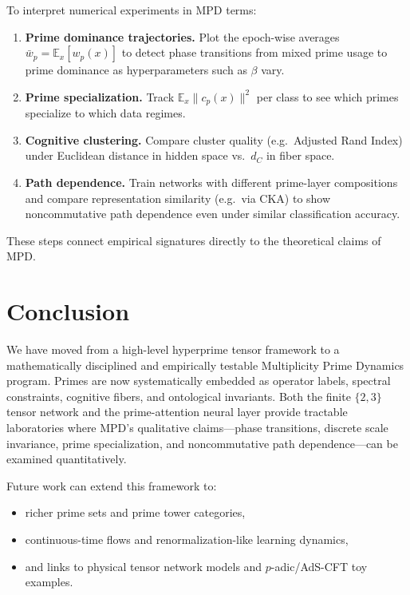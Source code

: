 \documentclass[11pt]{article}
\begin{document}
To interpret numerical experiments in MPD terms:

\begin{enumerate}[nosep]
  \item \textbf{Prime dominance trajectories.} Plot the epoch-wise averages $\bar{w}_p = \mathbb{E}_x[w_p(x)]$ to detect phase transitions from mixed prime usage to prime dominance as hyperparameters such as $\beta$ vary.
  \item \textbf{Prime specialization.} Track $\mathbb{E}_x\|c_p(x)\|^2$ per class to see which primes specialize to which data regimes.
  \item \textbf{Cognitive clustering.} Compare cluster quality (e.g.\ Adjusted Rand Index) under Euclidean distance in hidden space vs.\ $d_C$ in fiber space.
  \item \textbf{Path dependence.} Train networks with different prime-layer compositions and compare representation similarity (e.g.\ via CKA) to show noncommutative path dependence even under similar classification accuracy.
\end{enumerate}

These steps connect empirical signatures directly to the theoretical claims of MPD.

\section{Conclusion}

We have moved from a high-level hyperprime tensor framework to a mathematically disciplined and empirically testable Multiplicity Prime Dynamics program. Primes are now systematically embedded as operator labels, spectral constraints, cognitive fibers, and ontological invariants. Both the finite $\{2,3\}$ tensor network and the prime-attention neural layer provide tractable laboratories where MPD's qualitative claims---phase transitions, discrete scale invariance, prime specialization, and noncommutative path dependence---can be examined quantitatively.

Future work can extend this framework to:

\begin{itemize}[nosep]
  \item richer prime sets and prime tower categories,
  \item continuous-time flows and renormalization-like learning dynamics,
  \item and links to physical tensor network models and $p$-adic/AdS-CFT toy examples.
\end{itemize}
\end{document}

